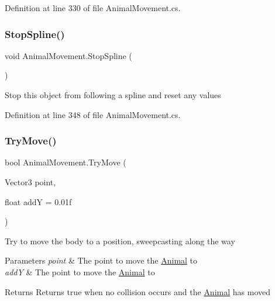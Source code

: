 Definition at line 330 of file Animal\+Movement.\+cs.

\mbox{\label{class_animal_movement_a920df529c4783a9adccd1f4fca9bb1b2}} 
\subsubsection{\texorpdfstring{Stop\+Spline()}{StopSpline()}}
{\footnotesize\ttfamily void Animal\+Movement.\+Stop\+Spline (\begin{DoxyParamCaption}{ }\end{DoxyParamCaption})}



Stop this object from following a spline and reset any values 



Definition at line 348 of file Animal\+Movement.\+cs.

\mbox{\label{class_animal_movement_a95055592a16686acb6ff78fc5b59f9e7}} 
\subsubsection{\texorpdfstring{Try\+Move()}{TryMove()}}
{\footnotesize\ttfamily bool Animal\+Movement.\+Try\+Move (\begin{DoxyParamCaption}\item[{Vector3}]{point,  }\item[{float}]{addY = {\ttfamily 0.01f} }\end{DoxyParamCaption})}



Try to move the body to a position, sweepcasting along the way 


\begin{DoxyParams}{Parameters}
{\em point} & The point to move the \mbox{\hyperlink{class_animal}{Animal}} to\\
\hline
{\em addY} & The point to move the \mbox{\hyperlink{class_animal}{Animal}} to\\
\hline
\end{DoxyParams}
\begin{DoxyReturn}{Returns}
Returns true when no collision occurs and the \mbox{\hyperlink{class_animal}{Animal}} has moved
\end{DoxyReturn}


